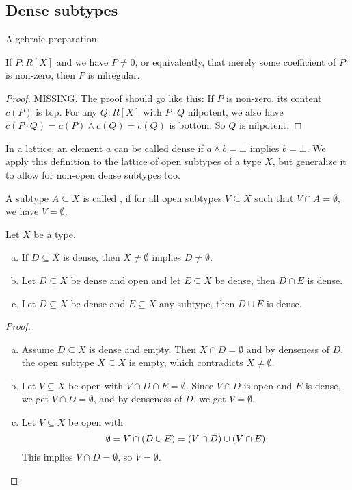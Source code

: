 \subsection{Dense subtypes}

Algebraic preparation:

\begin{lemma}%
  \label{nilregular-non-zero-polynomial}
  If $P:R[X]$ and we have $P\neq 0$, or equivalently,
  that merely some coefficient of $P$ is non-zero,
  then $P$ is nilregular.
\end{lemma}

\begin{proof}
  MISSING.
  The proof should go like this: If $P$ is non-zero, its content $c(P)$ is top.
  For any $Q:R[X]$ with $P\cdot Q$ nilpotent, we also have $c(P\cdot Q)=c(P)\wedge c(Q)=c(Q)$ is bottom.
  So $Q$ is nilpotent.
\end{proof}

In a lattice,
an element $a$ can be called dense
if $a \wedge b = \bot$ implies $b = \bot$.
We apply this definition to the lattice of open subtypes of a type $X$,
but generalize it to allow for non-open dense subtypes too.

\begin{definition}
  A subtype $A\subseteq X$ is called ,
  if for all open subtypes $V\subseteq X$ such that $V\cap A=\emptyset$, we have $V=\emptyset$.
\end{definition}

\begin{lemma}%
  \label{basic-dense-operations}
  Let $X$ be a type.
  \begin{enumerate}[(a)]
  \item If $D\subseteq X$ is dense, then $X\neq \emptyset$ implies $D\neq \emptyset$.
  \item Let $D \subseteq X$ be dense and open and let $E \subseteq X$ be dense,
    then $D\cap E$ is dense.
  \item Let $D\subseteq X$ be dense and $E\subseteq X$ any subtype, then $D\cup E$ is dense.
  \end{enumerate}
\end{lemma}

\begin{proof}
  \begin{enumerate}[(a)]
  \item Assume $D\subseteq X$ is dense and empty.
    Then $X\cap D=\emptyset$ and by denseness of $D$,
    the open subtype $X \subseteq X$ is empty,
    which contradicts $X\neq \emptyset$.
  \item Let $V\subseteq X$ be open with $V\cap D\cap E=\emptyset$.
    Since $V \cap D$ is open and $E$ is dense,
    we get $V \cap D = \emptyset$,
    and by denseness of $D$, we get $V=\emptyset$.
  \item Let $V\subseteq X$ be open with
    \[
      \emptyset=V\cap (D\cup E)=(V\cap D) \cup (V\cap E)\rlap{.}
    \]
    This implies $V\cap D=\emptyset$,
    so $V=\emptyset$.
  \end{enumerate}
\end{proof}

